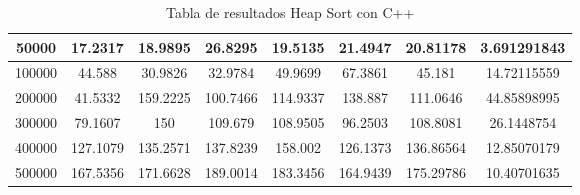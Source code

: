 \documentclass{article}
\begin{document}
\begin{table}[]
\begin{tabular}{|c|c|c|c|c|c|c|c| }
                50000	&17.2317	&18.9895	&26.8295	&19.5135	&21.4947	&20.81178&	3.691291843\\ \hline
                100000	&44.588	&30.9826	&32.9784	&49.9699	&67.3861	&45.181	&14.72115559\\ \hline
                200000	&41.5332	&159.2225	&100.7466	&114.9337	&138.887	&111.0646	&44.85898995\\ \hline
                300000	&79.1607	&150	&109.679	&108.9505	&96.2503	&108.8081	&26.1448754\\ \hline
                400000	&127.1079	&135.2571&	137.8239	&158.002&	126.1373&	136.86564	&12.85070179\\ \hline
                500000	&167.5356	&171.6628&	189.0014	&183.3456	&164.9439	&175.29786&	10.40701635\\ \hline
        \end{tabular}
           \caption{Tabla de resultados Heap Sort con C++}
        \label{tab:heapSortC}
    \end{table}
\end{document}
